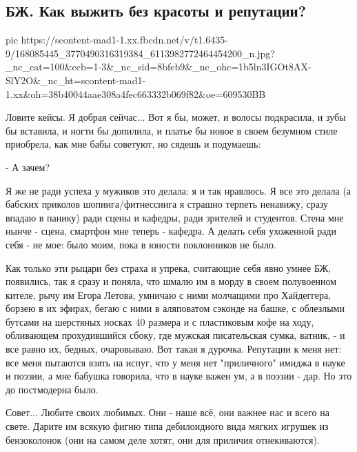  
 
 
 
 

\subsection{БЖ. Как выжить без красоты и репутации?}


\ifcmt
  pic https://scontent-mad1-1.xx.fbcdn.net/v/t1.6435-9/168085445_3770490316319384_6113982772464454200_n.jpg?_nc_cat=100&ccb=1-3&_nc_sid=8bfeb9&_nc_ohc=1b5ln3IGOt8AX-SlY2O&_nc_ht=scontent-mad1-1.xx&oh=38b40044aae308a4fec663332b069f82&oe=609530BB
\fi

Ловите кейсы. Я добрая сейчас... Вот я бы, может, и волосы подкрасила, и зубы
бы вставила, и ногти бы допилила, и платье бы новое в своем безумном стиле
приобрела, как мне бабы советуют, но сядешь и подумаешь:

- А зачем?

Я же не ради успеха у мужиков это делала: я и так нравлюсь. Я все это делала (а
бабских приколов шопинга/фитнессинга я страшно терпеть ненавижу, сразу впадаю в
панику) ради сцены и кафедры, ради зрителей и студентов. Стена мне нынче -
сцена, смартфон мне теперь - кафедра. А делать себя ухоженной ради себя - не
мое: было моим, пока в юности поклонников не было. 

Как только эти рыцари без страха и упрека, считающие себя явно умнее БЖ,
появились, так я сразу и поняла, что шмалю им в морду в своем полувоенном
кителе, рычу им Егора Летова, умничаю с ними молчащими про Хайдеггера, борзею в
их эфирах, бегаю с ними в аляповатом сэконде на башке, с облезлыми бутсами на
шерстяных носках 40 размера и с пластиковым кофе на ходу, обливающем
прохудившийся сбоку, где мужская писательская сумка, ватник, - и все равно их,
бедных, очаровываю. Вот такая я дурочка. Репутации к меня нет: все меня
пытаются взять на испуг, что у меня нет "приличного" имиджа в науке и поэзии, а
мне бабушка говорила, что в науке важен ум, а в поэзии - дар. Но это до
постмодерна было.

Совет... Любите своих любимых. Они - наше всё, они важнее нас и всего на свете.
Дарите им всякую фигню типа дебилоидного вида мягких игрушек из бензоколонок
(они на самом деле хотят, они для приличия отнекиваются).
